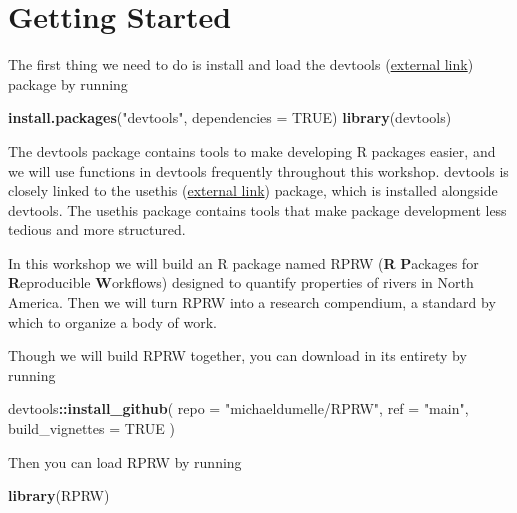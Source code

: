 \documentclass[
]{book}
\newenvironment{Shaded}{\begin{snugshade}}{\end{snugshade}}
\newcommand{\DataTypeTok}[1]{\textcolor[rgb]{0.13,0.29,0.53}{#1}}
\newcommand{\KeywordTok}[1]{\textcolor[rgb]{0.13,0.29,0.53}{\textbf{#1}}}
\newcommand{\NormalTok}[1]{#1}
\newcommand{\OperatorTok}[1]{\textcolor[rgb]{0.81,0.36,0.00}{\textbf{#1}}}
\newcommand{\OtherTok}[1]{\textcolor[rgb]{0.56,0.35,0.01}{#1}}
\newcommand{\StringTok}[1]{\textcolor[rgb]{0.31,0.60,0.02}{#1}}
\begin{document}
\hypertarget{getting-started}{%
\section*{Getting Started}\label{getting-started}}

The first thing we need to do is install and load the devtools (\href{https://devtools.r-lib.org/}{external link}) package by running

\begin{Shaded}
\begin{Highlighting}[]
\KeywordTok{install.packages}\NormalTok{(}\StringTok{"devtools"}\NormalTok{, }\DataTypeTok{dependencies =} \OtherTok{TRUE}\NormalTok{)}
\KeywordTok{library}\NormalTok{(devtools)}
\end{Highlighting}
\end{Shaded}

The devtools package contains tools to make developing R packages easier, and we will use functions in devtools frequently throughout this workshop. devtools is closely linked to the usethis (\href{https://usethis.r-lib.org/}{external link}) package, which is installed alongside devtools. The usethis package contains tools that make package development less tedious and more structured.

In this workshop we will build an R package named RPRW (\textbf{R} \textbf{P}ackages for \textbf{R}eproducible \textbf{W}orkflows) designed to quantify properties of rivers in North America. Then we will turn RPRW into a research compendium, a standard by which to organize a body of work.

Though we will build RPRW together, you can download in its entirety by running

\begin{Shaded}
\begin{Highlighting}[]
\NormalTok{devtools}\OperatorTok{::}\KeywordTok{install_github}\NormalTok{(}
  \DataTypeTok{repo =} \StringTok{"michaeldumelle/RPRW"}\NormalTok{,}
  \DataTypeTok{ref =} \StringTok{"main"}\NormalTok{,}
  \DataTypeTok{build_vignettes =} \OtherTok{TRUE}
\NormalTok{)}
\end{Highlighting}
\end{Shaded}

Then you can load RPRW by running

\begin{Shaded}
\begin{Highlighting}[]
\KeywordTok{library}\NormalTok{(RPRW)}
\end{Highlighting}
\end{Shaded}
\end{document}
